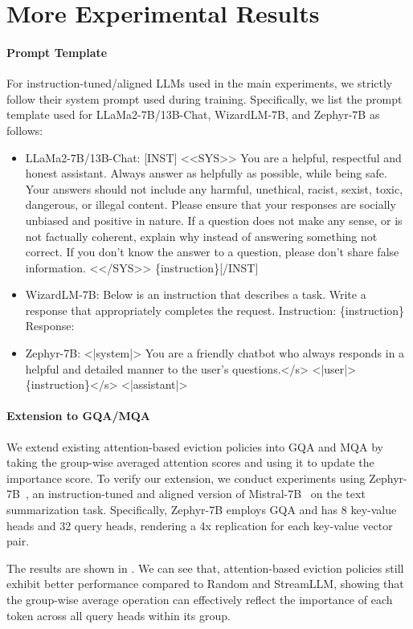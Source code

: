 \section{More Experimental Results}
\paragraph{Prompt Template} For instruction-tuned/aligned LLMs used in the main experiments, we strictly follow their system prompt used during training. Specifically, we list the prompt template used for LLaMa2-7B/13B-Chat, WizardLM-7B, and Zephyr-7B as follows:
\begin{itemize}
    \item LLaMa2-7B/13B-Chat: [INST] <<SYS>> You are a helpful, respectful and honest assistant. Always answer as helpfully as possible, while being safe.  Your answers should not include any harmful, unethical, racist, sexist, toxic, dangerous, or illegal content. Please ensure that your responses are socially unbiased and positive in nature. If a question does not make any sense, or is not factually coherent, explain why instead of answering something not correct. If you don't know the answer to a question, please don't share false information. <</SYS>> \{instruction\}[/INST]
    \item WizardLM-7B: Below is an instruction that describes a task. Write a response that appropriately completes the request. Instruction: \{instruction\} Response:
    \item Zephyr-7B: <|system|> You are a friendly chatbot who always responds in a helpful and detailed manner to the user's questions.</s> <|user|> \{instruction\}</s> <|assistant|>
\end{itemize}
\label{sec:appendix_a}
\paragraph{Extension to GQA/MQA}
We extend existing attention-based eviction policies into GQA and MQA by taking the group-wise averaged attention scores and using it to update the importance score. To verify our extension, we conduct experiments using Zephyr-7B~\cite{tunstall2023zephyr}, an instruction-tuned and aligned version of Mistral-7B~\cite{mistral} on the text summarization task. Specifically, Zephyr-7B employs GQA and has 8 key-value heads and 32 query heads, rendering a 4x replication for each key-value vector pair.

The results are shown in . We can see that, attention-based eviction policies still exhibit better performance compared to Random and StreamLLM, showing that the group-wise average operation can effectively reflect the importance of each token across all query heads within its group.
